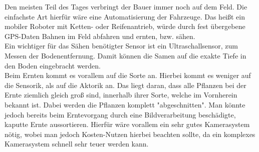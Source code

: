 Den meisten Teil des Tages verbringt der Bauer immer noch auf dem Feld. Die einfachste Art hierfür wäre eine Automatisierung der Fahrzeuge. Das heißt ein mobiler Roboter mit Ketten- oder Reifenantrieb, würde durch fest übergebene GPS-Daten Bahnen im Feld abfahren und ernten, bzw. sähen. \\
Ein wichtiger für das Sähen benötigter Sensor ist ein Ultraschallsensor, zum Messen der Bodenentfernung. Damit können die Samen auf die exakte Tiefe in den Boden eingebracht werden.\\
Beim Ernten kommt es vorallem auf die Sorte an. Hierbei kommt es weniger auf die Sensorik, als auf die Aktorik an. Das liegt daran, dass alle Pflanzen bei der Ernte ziemlich gleich groß sind, innerhalb ihrer Sorte, welche im Vornherein bekannt ist. Dabei werden die Pflanzen komplett "abgeschnitten". Man könnte jedoch bereits beim Erntevorgang durch eine Bildverarbeitung beschädigte, kaputte Ernte aussortieren. Hierfür wäre vorallem ein sehr gutes Kamerasystem nötig, wobei man jedoch Kosten-Nutzen hierbei beachten sollte, da ein komplexes Kamerasystem schnell sehr teuer werden kann.
